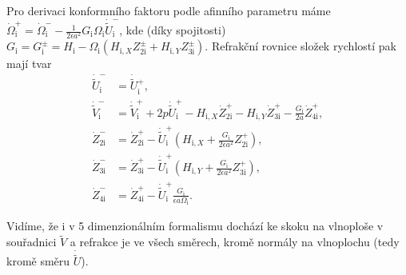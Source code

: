Pro derivaci konformního faktoru podle afinního parametru máme
$\dot{\Omega}_{\mathrm{i}}^{+} = \dot{\Omega}^{-}_{\mathrm{i}} - \frac{1}{2 \epsilon a^2} G_{\mathrm{i}} \Omega_{\mathrm{i}}  \dot{\tilde{U}}^{-}_{\mathrm{i}}$, kde (díky spojitosti) $G_{\mathrm{i}}=G_{\mathrm{i}}^{\pm} = H_{\mathrm{i}} - \Omega_{\mathrm{i}}(H_{\mathrm{i}, X} Z_{2\mathrm{i}}^{\pm} + H_{\mathrm{i}, Y}Z_{3\mathrm{i}}^{\pm})$.
Refrakční rovnice složek rychlostí pak mají tvar
\begin{equation}
    \begin{split}
        \dot{\tilde{U}}^{-}_{\mathrm{i}} &= \dot{\tilde{U}}{}^{+}_{\mathrm{i}}, \\
        \dot{\tilde{V}}^{-}_{\mathrm{i}} &= \dot{\tilde{V}}^{+}_{\mathrm{i}} + 2 p \dot{\tilde{U}}^{+}_{\mathrm{i}} - H_{\mathrm{i}, X} \dot Z_{2\mathrm{i}}^{+} - H_{\mathrm{i}, Y} \dot Z_{3\mathrm{i}}^{+} - \frac{G_\mathrm{i}}{2a} \dot Z_{4\mathrm{i}}^{+}, \\
        \dot Z_{2\mathrm{i}}^{-} &= \dot Z_{2\mathrm{i}}^{+} - \dot{\tilde{U}}^{+}_{\mathrm{i}} \left( H_{\mathrm{i},X} + \frac{G_{\mathrm{i}}}{2 \epsilon a^2} Z_{2\mathrm{i}}^{+}\right), \\
        \dot Z_{3\mathrm{i}}^{-} &= \dot Z_{3\mathrm{i}}^{+} - \dot{\tilde{U}}^{+}_{\mathrm{i}} \left( H_{\mathrm{i},Y} + \frac{G_{\mathrm{i}}}{2 \epsilon a^2} Z_{3\mathrm{i}}^{+}\right), \\
        \dot Z_{4\mathrm{i}}^{-} &= \dot Z_{4\mathrm{i}}^{+} - \dot{\tilde{U}}^{+}_{\mathrm{i}} \frac{G_{\mathrm{i}}}{\epsilon a \Omega_{\mathrm{i}}}.
    \end{split}
\end{equation}

Vidíme, že i v 5 dimenzionálním formalismu dochází ke skoku na vlnoploše v souřadnici $\tilde{V}$ a refrakce je ve všech směrech, kromě normály na vlnoplochu (tedy kromě směru $\dot{\tilde{U}}$).

